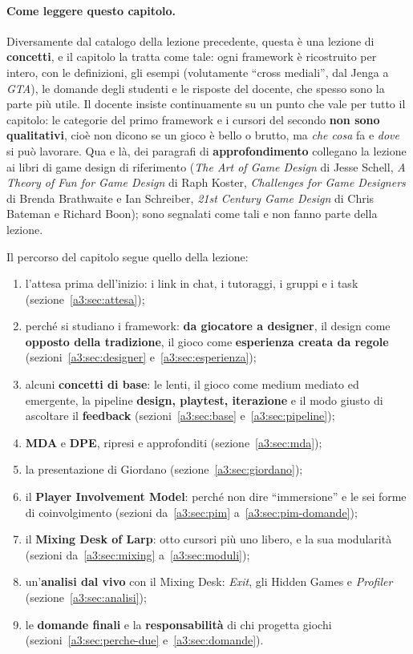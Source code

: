 \paragraph{Come leggere questo capitolo.} Diversamente dal catalogo della lezione
precedente, questa è una lezione di \textbf{concetti}, e il capitolo la tratta
come tale: ogni framework è ricostruito per intero, con le definizioni, gli
esempi (volutamente ``cross mediali'', dal Jenga a \emph{GTA}), le domande degli
studenti e le risposte del docente, che spesso sono la parte più utile. Il
docente insiste continuamente su un punto che vale per tutto il capitolo: le
categorie del primo framework e i cursori del secondo \textbf{non sono
qualitativi}, cioè non dicono se un gioco è bello o brutto, ma \emph{che cosa}
fa e \emph{dove} si può lavorare. Qua e là, dei paragrafi di
\textbf{approfondimento} collegano la lezione ai libri di game design di
riferimento (\emph{The Art of Game Design} di Jesse Schell, \emph{A Theory of
Fun for Game Design} di Raph Koster, \emph{Challenges for Game Designers} di
Brenda Brathwaite e Ian Schreiber, \emph{21st Century Game Design} di Chris
Bateman e Richard Boon); sono segnalati come tali e non fanno parte della
lezione.

Il percorso del capitolo segue quello della lezione:
\begin{enumerate}
  \item l'attesa prima dell'inizio: i link in chat, i tutoraggi, i gruppi e i
        task (sezione~\ref{a3:sec:attesa});
  \item perché si studiano i framework: \textbf{da giocatore a designer}, il
        design come \textbf{opposto della tradizione}, il gioco come
        \textbf{esperienza creata da regole} (sezioni~\ref{a3:sec:designer}
        e~\ref{a3:sec:esperienza});
  \item alcuni \textbf{concetti di base}: le lenti, il gioco come medium
        mediato ed emergente, la pipeline \textbf{design, playtest,
        iterazione} e il modo giusto di ascoltare il \textbf{feedback}
        (sezioni~\ref{a3:sec:base} e~\ref{a3:sec:pipeline});
  \item \textbf{MDA} e \textbf{DPE}, ripresi e approfonditi
        (sezione~\ref{a3:sec:mda});
  \item la presentazione di Giordano (sezione~\ref{a3:sec:giordano});
  \item il \textbf{Player Involvement Model}: perché non dire
        ``immersione'' e le sei forme di coinvolgimento
        (sezioni da~\ref{a3:sec:pim} a~\ref{a3:sec:pim-domande});
  \item il \textbf{Mixing Desk of Larp}: otto cursori più uno libero, e la
        sua modularità (sezioni da~\ref{a3:sec:mixing} a~\ref{a3:sec:moduli});
  \item un'\textbf{analisi dal vivo} con il Mixing Desk: \emph{Exit},
        gli Hidden Games e \emph{Profiler} (sezione~\ref{a3:sec:analisi});
  \item le \textbf{domande finali} e la \textbf{responsabilità} di chi
        progetta giochi (sezioni~\ref{a3:sec:perche-due}
        e~\ref{a3:sec:domande}).
\end{enumerate}


